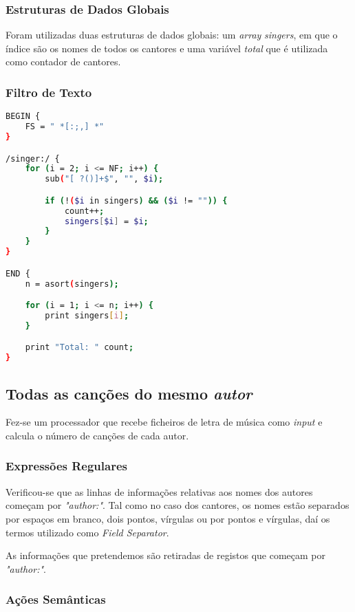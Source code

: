 \documentclass{article}
\begin{document}
\subsubsection{Estruturas de Dados Globais}

Foram utilizadas duas estruturas de dados globais: um \emph{array} \emph{singers}, em que o índice são os nomes de todos os cantores e uma variável \emph{total} que é utilizada como contador de cantores.

\subsubsection{Filtro de Texto}

\begin{lstlisting}[language=bash]
BEGIN {
	FS = " *[:;,] *"
}

/singer:/ {
	for (i = 2; i <= NF; i++) {
	    sub("[ ?()]+$", "", $i);

	    if (!($i in singers) && ($i != "")) {
	    	count++;
	    	singers[$i] = $i;
	    }
	}
}

END {
	n = asort(singers);

	for (i = 1; i <= n; i++) {
		print singers[i];
	}

	print "Total: " count;
}
\end{lstlisting}


\subsection{Todas as canções do mesmo \emph{autor}}

Fez-se um processador que recebe ficheiros de letra de música como \emph{input} e calcula o número de canções de cada autor.

\subsubsection{Expressões Regulares}

Verificou-se que as linhas de informações relativas aos nomes dos autores começam por \emph{"author:"}. Tal como no caso dos cantores, os nomes estão separados por espaços em branco, dois pontos, vírgulas ou por pontos e vírgulas, daí os termos utilizado como \emph{Field Separator}.

As informações que pretendemos são retiradas de registos que começam por \emph{"author:"}.

\subsubsection{Ações Semânticas}
\end{document}
